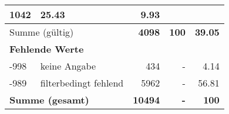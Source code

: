 \begin{longtable}{lXrrr}
       \num{1042} &
       \num[round-mode=places,round-precision=2]{25.43} &
         \num[round-mode=places,round-precision=2]{9.93} \\
     \midrule
     \multicolumn{2}{l}{Summe (gültig)} &
       \textbf{\num{4098}} &
     \textbf{\num{100}} &
       \textbf{\num[round-mode=places,round-precision=2]{39.05}} \\
     \multicolumn{5}{l}{\textbf{Fehlende Werte}}\\
       -998 &
       keine Angabe &
         \num{434} &
        - &
         \num[round-mode=places,round-precision=2]{4.14} \\
       -989 &
       filterbedingt fehlend &
         \num{5962} &
        - &
         \num[round-mode=places,round-precision=2]{56.81} \\
     \midrule
     \multicolumn{2}{l}{\textbf{Summe (gesamt)}} &
          \textbf{\num{10494}} &
        \textbf{-} &
        \textbf{\num{100}} \\
     \bottomrule
     \end{longtable}
     
